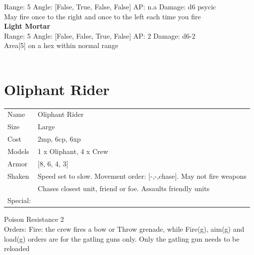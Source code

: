 Range: 5  Angle: [False, True, False, False] AP: n.a Damage: d6 psycic \\
May fire once to the right and once to the left each time you fire\\ 




{\bf Light Mortar } \\



Range: 5  Angle: [False, False, True, False] AP: 2 Damage: d6-2 \\
Area[5] on a hex within normal range\\ 




 
\ \\













\clearpage

\section{ Oliphant Rider }

\begin{tabular}{ll}
  Name & Oliphant Rider \\
  Size & Large\\
  Cost & 2mp, 6cp, 6xp\\
  Models & 1 x Oliphant, 4 x Crew\\
  Armor & [8, 6, 4, 3]\\
  Shaken & Speed set to slow. Movement order: [-,-,chase]. May not fire weapons\\ &Chases closest unit, friend or foe. Assaults friendly units\\
  Special: \\
\end{tabular}

\noindent Poison Resistance 2\\ 
Orders: Fire: the crew fires a bow or Throw grenade, while Fire(g), aim(g) and load(g) orders are for the gatling guns only. Only the gatling gun needs to be reloaded\\ 


